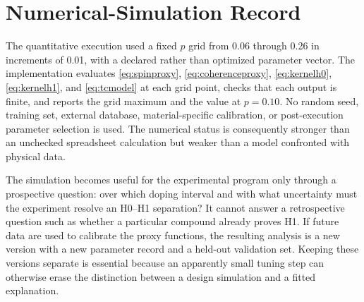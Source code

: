 \documentclass[conference]{IEEEtran}
\begin{document}
\section{Numerical-Simulation Record}

The quantitative execution used a fixed $p$ grid from 0.06 through 0.26 in increments of 0.01, with a declared rather than optimized parameter vector. The implementation evaluates \eqref{eq:spinproxy}, \eqref{eq:coherenceproxy}, \eqref{eq:kernelh0}, \eqref{eq:kernelh1}, and \eqref{eq:tcmodel} at each grid point, checks that each output is finite, and reports the grid maximum and the value at $p=0.10$. No random seed, training set, external database, material-specific calibration, or post-execution parameter selection is used. The numerical status is consequently stronger than an unchecked spreadsheet calculation but weaker than a model confronted with physical data.

The simulation becomes useful for the experimental program only through a prospective question: over which doping interval and with what uncertainty must the experiment resolve an H0--H1 separation? It cannot answer a retrospective question such as whether a particular compound already proves H1. If future data are used to calibrate the proxy functions, the resulting analysis is a new version with a new parameter record and a held-out validation set. Keeping these versions separate is essential because an apparently small tuning step can otherwise erase the distinction between a design simulation and a fitted explanation.

\balance
\end{document}
